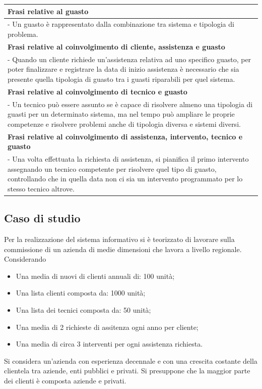 \documentclass[legalpaper]{article}
\begin{document}
\begin{tabular}{ |p{16 cm}| }
\hline
\textbf{Frasi relative al guasto}  \\
\hline
- Un guasto è rappresentato dalla combinazione tra sistema e tipologia di problema.\\
\hline
\textbf{Frasi relative al coinvolgimento di cliente, assistenza e guasto}  \\
\hline
- Quando un cliente richiede un'assistenza relativa ad uno specifico guasto, per poter finalizzare e registrare la data di inizio assistenza è necessario che sia presente quella tipologia di guasto tra i guasti riparabili per quel sistema.\\
\hline
\textbf{Frasi relative al coinvolgimento di tecnico e guasto}  \\
\hline
- Un tecnico può essere assunto se è capace di risolvere almeno una tipologia di guasti per un determinato sistema, ma nel tempo può ampliare le proprie competenze e risolvere problemi anche di tipologia diversa e sistemi diversi.\\
\hline


\textbf{Frasi relative al coinvolgimento di assistenza, intervento, tecnico e guasto}  \\
\hline
- Una volta effettuata la richiesta di assistenza, si pianifica il primo intervento assegnando un tecnico competente per risolvere quel tipo di guasto, controllando che in quella data non ci sia un intervento programmato per lo stesso tecnico altrove.\\
\hline
\end{tabular}

\subsection{Caso di studio}
Per la realizzazione del sistema informativo si è teorizzato di lavorare sulla commissione di un azienda di medie dimensioni che lavora a livello regionale. \\ Considerando
\begin{itemize}
    \item Una media di nuovi di clienti annuali di: 100 unità;
    \item Una lista clienti composta da: 1000 unità;
    \item Una lista dei tecnici composta da: 50 unità;
    \item Una media di 2 richieste di assitenza ogni anno per cliente;
    \item Una media di circa 3 interventi per ogni assistenza richiesta.
\end{itemize}
Si considera un'azienda con esperienza decennale e con una crescita costante della clientela tra aziende, enti pubblici e privati.  Si presuppone che la maggior parte dei clienti è composta aziende e privati.
\end{document}

